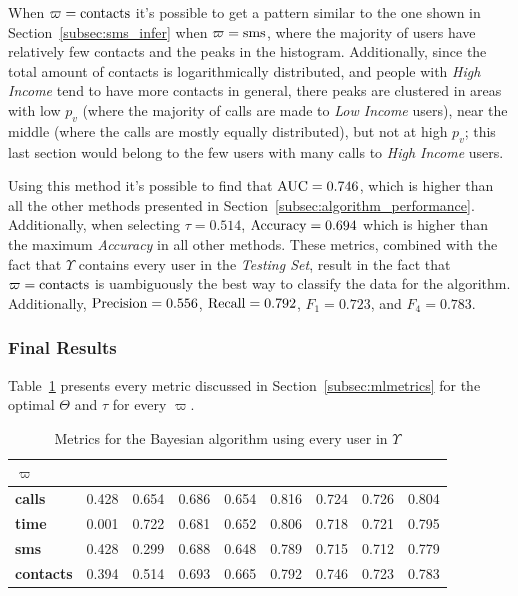 When $\varpi = \operatorname{contacts}$ it's possible to get a pattern similar to the one shown in Section~\ref{subsec:sms_infer} when $\varpi = \operatorname{sms}$, where the majority of users have relatively few contacts and the peaks in the histogram. Additionally, since the total amount of contacts is logarithmically distributed, and people with \emph{High Income} tend to have more contacts in general, there peaks are clustered in areas with low $p_v$ (where the majority of calls are made to \emph{Low Income} users), near the middle (where the calls are mostly equally distributed), but not at high $p_v$; this last section would belong to the few users with many calls to \emph{High Income} users.

Using this method it's possible to find that $\operatorname{AUC} = 0.746$, which is higher than all the other methods presented in Section~\ref{subsec:algorithm_performance}. Additionally, when selecting $\tau = 0.514$, $\operatorname{Accuracy} = 0.694$ which is higher than the maximum \emph{Accuracy} in all other methods. These metrics, combined with the fact that $\Upsilon$ contains every user in the \emph{Testing Set}, result in the fact that $\varpi = \operatorname{contacts}$ is uambiguously the best way to classify the data for the algorithm. Additionally, $\operatorname{Precision} = 0.556$, $\operatorname{Recall} = 0.792$, $F_1 = 0.723$, and $F_4 = 0.783$.

\subsubsection{Final Results}

Table~\ref{tab:bayesresults} presents every metric discussed in Section~\ref{subsec:mlmetrics} for the optimal $\Theta$ and $\tau$ for every $\varpi$.

\begin{table}
\centering
\begin{tabular}{>{\bfseries}l >{\hspace{1em}}r r >{\hspace{1em}}r r r r r r}
\toprule
$\varpi$ & \ct{Opt. $\Theta$} & \ct{Opt. $\tau$} & \ct{Acc.} & \ct{Prec.} & \ct{Rec.} & \ct{AUC} & \ct{F\textsubscript{1}} & \ct{F\textsubscript{4}} \\
\midrule
calls    & 0.428 & 0.654 & 0.686 & 0.654 & 0.816 & 0.724 & 0.726 & 0.804 \\
time     & 0.001 & 0.722 & 0.681 & 0.652 & 0.806 & 0.718 & 0.721 & 0.795 \\
sms      & 0.428 & 0.299 & 0.688 & 0.648 & 0.789 & 0.715 & 0.712 & 0.779 \\
contacts & 0.394 & 0.514 & 0.693 & 0.665 & 0.792 & 0.746 & 0.723 & 0.783 \\
\bottomrule
\end{tabular}
\caption{Metrics for the Bayesian algorithm using every user in $\Upsilon$}
\label{tab:bayesresults}
\end{table}

